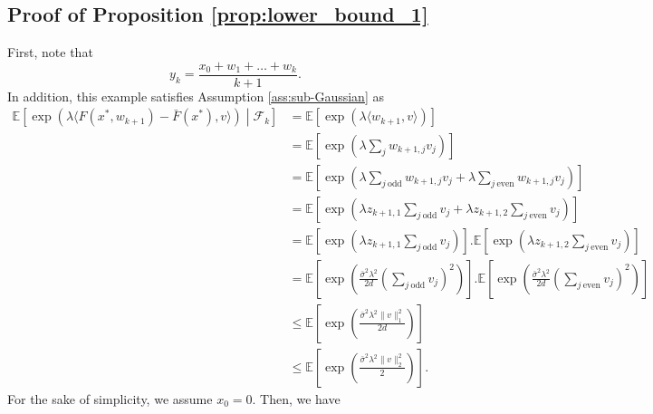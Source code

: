 \documentclass[letterpaper, 10 pt]{article}
\newcommand{\E}{\mathbb{E}}
\begin{document}
\subsection{Proof of Proposition \ref{prop:lower_bound_1}} \label{proof:lower_bound_1}
    First, note that
    \[ y_k=\frac{x_0+w_1+\dots+w_k}{k+1}. \]
    In addition, this example satisfies Assumption \ref{ass:sub-Gaussian} as
\begin{align*}
    \mathbb{E} \left[\exp\left(\lambda \langle F(x^*,w_{k+1}) - \bar{F}(x^*), v \rangle \right) \middle| \mathcal{F}_k \right] & = \mathbb{E} \left[\exp\left(\lambda \langle w_{k+1} , v \rangle \right)  \right]\\
    &= \mathbb{E} \left[\exp\left(\lambda \sum_{j} w_{{k+1},j} v_j  \right)  \right]\\
    &= \mathbb{E} \left[\exp\left(\lambda \sum_{j~ \text{odd}} w_{{k+1},j} v_j   + \lambda\sum_{j~ \text{even}} w_{{k+1},j} v_j\right)  \right]\\
    &= \mathbb{E} \left[\exp\left(\lambda z_{{k+1},1}\sum_{j~ \text{odd}}  v_j   + \lambda z_{{k+1},2}\sum_{j~ \text{even}}  v_j\right)  \right]\\
    &= \mathbb{E} \left[\exp\left(\lambda z_{{k+1},1}\sum_{j~ \text{odd}}  v_j \right)\right]  .\E\left[\exp\left( \lambda z_{{k+1},2}\sum_{j~ \text{even}}  v_j\right)  \right]\\
    &= \mathbb{E} \left[\exp\left( \frac{\bar{\sigma}^2\lambda^2}{2d} \left(\sum_{j~ \text{odd}}  v_j\right)^2 \right)\right]  .\E\left[\exp \left( \frac{\bar{\sigma}^2\lambda^2}{2d} \left(\sum_{j~ \text{even}}  v_j\right)^2\right)  \right]\\
    &\leq \mathbb{E} \left[\exp\left( \frac{\bar{\sigma}^2\lambda^2 \|v\|_1^2}{2d} \right)\right] \\
    &\leq \mathbb{E} \left[\exp\left( \frac{\bar{\sigma}^2\lambda^2 \|v\|_2^2}{2} \right)\right].
\end{align*}
For the sake of simplicity, we assume $x_0=0$. Then, we have
\end{document}

